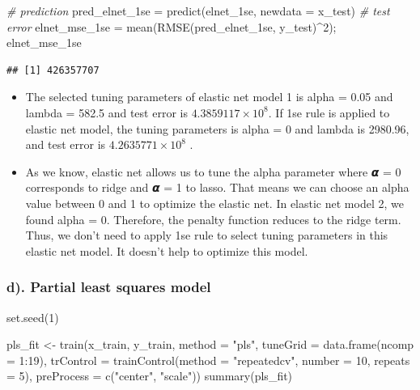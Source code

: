 \documentclass[
]{article}
\newenvironment{Shaded}{\begin{snugshade}}{\end{snugshade}}
\newcommand{\AttributeTok}[1]{\textcolor[rgb]{0.77,0.63,0.00}{#1}}
\newcommand{\CommentTok}[1]{\textcolor[rgb]{0.56,0.35,0.01}{\textit{#1}}}
\newcommand{\DecValTok}[1]{\textcolor[rgb]{0.00,0.00,0.81}{#1}}
\newcommand{\FunctionTok}[1]{\textcolor[rgb]{0.00,0.00,0.00}{#1}}
\newcommand{\NormalTok}[1]{#1}
\newcommand{\OtherTok}[1]{\textcolor[rgb]{0.56,0.35,0.01}{#1}}
\newcommand{\SpecialCharTok}[1]{\textcolor[rgb]{0.00,0.00,0.00}{#1}}
\newcommand{\StringTok}[1]{\textcolor[rgb]{0.31,0.60,0.02}{#1}}
\begin{document}
\begin{Shaded}
\begin{Highlighting}[]
\CommentTok{\# prediction}
\NormalTok{pred\_elnet\_1se }\OtherTok{=} \FunctionTok{predict}\NormalTok{(elnet\_1se, }\AttributeTok{newdata =}\NormalTok{ x\_test)}
\CommentTok{\# test error}
\NormalTok{elnet\_mse\_1se }\OtherTok{=} \FunctionTok{mean}\NormalTok{(}\FunctionTok{RMSE}\NormalTok{(pred\_elnet\_1se, y\_test)}\SpecialCharTok{\^{}}\DecValTok{2}\NormalTok{); elnet\_mse\_1se}
\end{Highlighting}
\end{Shaded}

\begin{verbatim}
## [1] 426357707
\end{verbatim}

\begin{itemize}
\item
  The selected tuning parameters of elastic net model 1 is alpha = 0.05
  and lambda = 582.5 and test error is
  \ensuremath{4.3859117\times 10^{8}}. If 1se rule is applied to elastic
  net model, the tuning parameters is alpha = 0 and lambda is 2980.96,
  and test error is \ensuremath{4.2635771\times 10^{8}} .
\item
  As we know, elastic net allows us to tune the alpha parameter where 𝞪
  = 0 corresponds to ridge and 𝞪 = 1 to lasso. That means we can choose
  an alpha value between 0 and 1 to optimize the elastic net. In elastic
  net model 2, we found alpha = 0. Therefore, the penalty function
  reduces to the ridge term. Thus, we don't need to apply 1se rule to
  select tuning parameters in this elastic net model. It doesn't help to
  optimize this model.
\end{itemize}

\hypertarget{d.-partial-least-squares-model}{%
\subsubsection{d). Partial least squares
model}\label{d.-partial-least-squares-model}}

\begin{Shaded}
\begin{Highlighting}[]
\FunctionTok{set.seed}\NormalTok{(}\DecValTok{1}\NormalTok{)}

\NormalTok{pls\_fit }\OtherTok{\textless{}{-}} \FunctionTok{train}\NormalTok{(x\_train, y\_train,}
                 \AttributeTok{method =} \StringTok{"pls"}\NormalTok{,}
                 \AttributeTok{tuneGrid =} \FunctionTok{data.frame}\NormalTok{(}\AttributeTok{ncomp =} \DecValTok{1}\SpecialCharTok{:}\DecValTok{19}\NormalTok{),}
                 \AttributeTok{trControl =}  \FunctionTok{trainControl}\NormalTok{(}\AttributeTok{method =} \StringTok{"repeatedcv"}\NormalTok{, }\AttributeTok{number =} \DecValTok{10}\NormalTok{, }\AttributeTok{repeats =} \DecValTok{5}\NormalTok{),}
                 \AttributeTok{preProcess =} \FunctionTok{c}\NormalTok{(}\StringTok{"center"}\NormalTok{, }\StringTok{"scale"}\NormalTok{))}
\FunctionTok{summary}\NormalTok{(pls\_fit)}
\end{Highlighting}
\end{Shaded}
\end{document}
